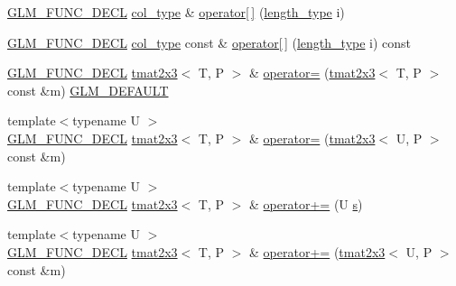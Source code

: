 \begin{DoxyCompactItemize}
\item 
\mbox{\hyperlink{setup_8hpp_ab2d052de21a70539923e9bcbf6e83a51}{G\+L\+M\+\_\+\+F\+U\+N\+C\+\_\+\+D\+E\+CL}} \mbox{\hyperlink{structglm_1_1tmat2x3_a62523fc3d245c37e15d68c3b9729f366}{col\+\_\+type}} \& \mbox{\hyperlink{structglm_1_1tmat2x3_a02f967c3523ed282c9dfa3b75e717bef}{operator\mbox{[}$\,$\mbox{]}}} (\mbox{\hyperlink{structglm_1_1tmat2x3_a25be85bf523cf3daa1c2b6b00ad45c82}{length\+\_\+type}} i)
\item 
\mbox{\hyperlink{setup_8hpp_ab2d052de21a70539923e9bcbf6e83a51}{G\+L\+M\+\_\+\+F\+U\+N\+C\+\_\+\+D\+E\+CL}} \mbox{\hyperlink{structglm_1_1tmat2x3_a62523fc3d245c37e15d68c3b9729f366}{col\+\_\+type}} const  \& \mbox{\hyperlink{structglm_1_1tmat2x3_a560b4b9dbb25b1dcd476f0a90168fb6d}{operator\mbox{[}$\,$\mbox{]}}} (\mbox{\hyperlink{structglm_1_1tmat2x3_a25be85bf523cf3daa1c2b6b00ad45c82}{length\+\_\+type}} i) const
\item 
\mbox{\hyperlink{setup_8hpp_ab2d052de21a70539923e9bcbf6e83a51}{G\+L\+M\+\_\+\+F\+U\+N\+C\+\_\+\+D\+E\+CL}} \mbox{\hyperlink{structglm_1_1tmat2x3}{tmat2x3}}$<$ T, P $>$ \& \mbox{\hyperlink{structglm_1_1tmat2x3_a1dc530650ac58a87d120532ad77ed332}{operator=}} (\mbox{\hyperlink{structglm_1_1tmat2x3}{tmat2x3}}$<$ T, P $>$ const \&m) \mbox{\hyperlink{setup_8hpp_aefce7051c376a64ba89fa93a9f63bc2c}{G\+L\+M\+\_\+\+D\+E\+F\+A\+U\+LT}}
\item 
{\footnotesize template$<$typename U $>$ }\\\mbox{\hyperlink{setup_8hpp_ab2d052de21a70539923e9bcbf6e83a51}{G\+L\+M\+\_\+\+F\+U\+N\+C\+\_\+\+D\+E\+CL}} \mbox{\hyperlink{structglm_1_1tmat2x3}{tmat2x3}}$<$ T, P $>$ \& \mbox{\hyperlink{structglm_1_1tmat2x3_afaeb9829210555e86d1bce194f4f57c2}{operator=}} (\mbox{\hyperlink{structglm_1_1tmat2x3}{tmat2x3}}$<$ U, P $>$ const \&m)
\item 
{\footnotesize template$<$typename U $>$ }\\\mbox{\hyperlink{setup_8hpp_ab2d052de21a70539923e9bcbf6e83a51}{G\+L\+M\+\_\+\+F\+U\+N\+C\+\_\+\+D\+E\+CL}} \mbox{\hyperlink{structglm_1_1tmat2x3}{tmat2x3}}$<$ T, P $>$ \& \mbox{\hyperlink{structglm_1_1tmat2x3_aee083f086e7c9f50519938741a380cd3}{operator+=}} (U \mbox{\hyperlink{glad_8h_af1b1d5edfea6a34daee7389b1b5810ad}{s}})
\item 
{\footnotesize template$<$typename U $>$ }\\\mbox{\hyperlink{setup_8hpp_ab2d052de21a70539923e9bcbf6e83a51}{G\+L\+M\+\_\+\+F\+U\+N\+C\+\_\+\+D\+E\+CL}} \mbox{\hyperlink{structglm_1_1tmat2x3}{tmat2x3}}$<$ T, P $>$ \& \mbox{\hyperlink{structglm_1_1tmat2x3_ac76cd77cbb00903d4ec4cb7a1ccd386c}{operator+=}} (\mbox{\hyperlink{structglm_1_1tmat2x3}{tmat2x3}}$<$ U, P $>$ const \&m)

\end{DoxyCompactItemize}
